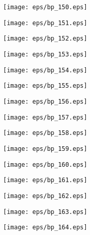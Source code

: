 \documentclass{book}
\begin{document}
	\clearpage\begin{figure}[p]
    \centering
	\texttt{[image: eps/bp\_150.eps]}
	\end{figure}
	\clearpage\begin{figure}[p]
    \centering
	\texttt{[image: eps/bp\_151.eps]}
	\end{figure}
	\clearpage\begin{figure}[p]
    \centering
	\texttt{[image: eps/bp\_152.eps]}
	\end{figure}
	\clearpage\begin{figure}[p]
    \centering
	\texttt{[image: eps/bp\_153.eps]}
	\end{figure}
	\clearpage\begin{figure}[p]
    \centering
	\texttt{[image: eps/bp\_154.eps]}
	\end{figure}
	\clearpage\begin{figure}[p]
    \centering
	\texttt{[image: eps/bp\_155.eps]}
	\end{figure}
	\clearpage\begin{figure}[p]
    \centering
	\texttt{[image: eps/bp\_156.eps]}
	\end{figure}
	\clearpage\begin{figure}[p]
    \centering
	\texttt{[image: eps/bp\_157.eps]}
	\end{figure}
	\clearpage\begin{figure}[p]
    \centering
	\texttt{[image: eps/bp\_158.eps]}
	\end{figure}
	\clearpage\begin{figure}[p]
    \centering
	\texttt{[image: eps/bp\_159.eps]}
	\end{figure}
	\clearpage\begin{figure}[p]
    \centering
	\texttt{[image: eps/bp\_160.eps]}
	\end{figure}
	\clearpage\begin{figure}[p]
    \centering
	\texttt{[image: eps/bp\_161.eps]}
	\end{figure}
	\clearpage\begin{figure}[p]
    \centering
	\texttt{[image: eps/bp\_162.eps]}
	\end{figure}
	\clearpage\begin{figure}[p]
    \centering
	\texttt{[image: eps/bp\_163.eps]}
	\end{figure}
	\clearpage\begin{figure}[p]
    \centering
	\texttt{[image: eps/bp\_164.eps]}
	\end{figure}
\end{document}
